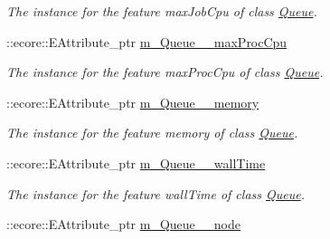 \begin{DoxyCompactItemize}
\begin{DoxyCompactList}\small\item\em The instance for the feature maxJobCpu of class \hyperlink{classTMS__Data_1_1Queue}{Queue}. \item\end{DoxyCompactList}\item 
\hypertarget{classTMS__Data_1_1TMS__DataPackage_a09b79e48ff96ab5e4682ea1bbd66ff05}{
::ecore::EAttribute\_\-ptr \hyperlink{classTMS__Data_1_1TMS__DataPackage_a09b79e48ff96ab5e4682ea1bbd66ff05}{m\_\-Queue\_\-\_\-maxProcCpu}}
\label{classTMS__Data_1_1TMS__DataPackage_a09b79e48ff96ab5e4682ea1bbd66ff05}

\begin{DoxyCompactList}\small\item\em The instance for the feature maxProcCpu of class \hyperlink{classTMS__Data_1_1Queue}{Queue}. \item\end{DoxyCompactList}\item 
\hypertarget{classTMS__Data_1_1TMS__DataPackage_a679948ee3e4a38677aa13f627347c962}{
::ecore::EAttribute\_\-ptr \hyperlink{classTMS__Data_1_1TMS__DataPackage_a679948ee3e4a38677aa13f627347c962}{m\_\-Queue\_\-\_\-memory}}
\label{classTMS__Data_1_1TMS__DataPackage_a679948ee3e4a38677aa13f627347c962}

\begin{DoxyCompactList}\small\item\em The instance for the feature memory of class \hyperlink{classTMS__Data_1_1Queue}{Queue}. \item\end{DoxyCompactList}\item 
\hypertarget{classTMS__Data_1_1TMS__DataPackage_ac0926050b9aa6175216a109bd320e507}{
::ecore::EAttribute\_\-ptr \hyperlink{classTMS__Data_1_1TMS__DataPackage_ac0926050b9aa6175216a109bd320e507}{m\_\-Queue\_\-\_\-wallTime}}
\label{classTMS__Data_1_1TMS__DataPackage_ac0926050b9aa6175216a109bd320e507}

\begin{DoxyCompactList}\small\item\em The instance for the feature wallTime of class \hyperlink{classTMS__Data_1_1Queue}{Queue}. \item\end{DoxyCompactList}\item 
\hypertarget{classTMS__Data_1_1TMS__DataPackage_aaba02fb99cf78e870a199b4b0b09239c}{
::ecore::EAttribute\_\-ptr \hyperlink{classTMS__Data_1_1TMS__DataPackage_aaba02fb99cf78e870a199b4b0b09239c}{m\_\-Queue\_\-\_\-node}}
\label{classTMS__Data_1_1TMS__DataPackage_aaba02fb99cf78e870a199b4b0b09239c}


\end{DoxyCompactItemize}
